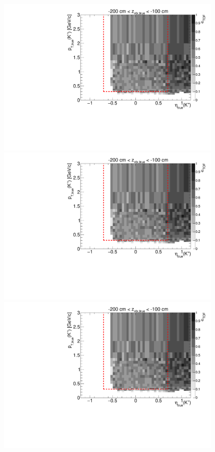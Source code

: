 \begin{figure}[hb]
{  \includegraphics[width=\linewidth,page=6]{graphics/eff/Eff2D_TOF_kaon_Plus.pdf}\\
  \includegraphics[width=\linewidth,page=8]{graphics/eff/Eff2D_TOF_kaon_Plus.pdf}\\
  \includegraphics[width=\linewidth,page=10]{graphics/eff/Eff2D_TOF_kaon_Plus.pdf}
}%
\end{figure}
